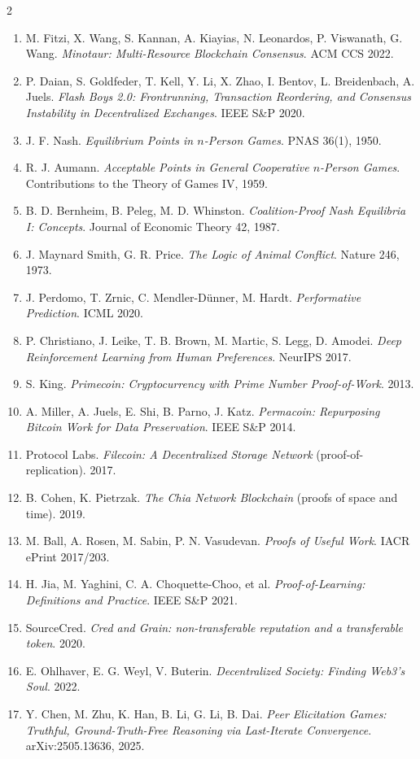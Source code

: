 \documentclass[10pt]{article}
\begin{document}
\begin{multicols}{2}
\begin{enumerate}[leftmargin=1.4em,itemsep=0pt]
\item M. Fitzi, X. Wang, S. Kannan, A. Kiayias, N. Leonardos, P. Viswanath, G. Wang. \emph{Minotaur: Multi-Resource Blockchain Consensus}. ACM CCS 2022.
\item P. Daian, S. Goldfeder, T. Kell, Y. Li, X. Zhao, I. Bentov, L. Breidenbach, A. Juels. \emph{Flash Boys 2.0: Frontrunning, Transaction Reordering, and Consensus Instability in Decentralized Exchanges}. IEEE S\&P 2020.
\item J. F. Nash. \emph{Equilibrium Points in $n$-Person Games}. PNAS 36(1), 1950.
\item R. J. Aumann. \emph{Acceptable Points in General Cooperative $n$-Person Games}. Contributions to the Theory of Games IV, 1959.
\item B. D. Bernheim, B. Peleg, M. D. Whinston. \emph{Coalition-Proof Nash Equilibria I: Concepts}. Journal of Economic Theory 42, 1987.
\item J. Maynard Smith, G. R. Price. \emph{The Logic of Animal Conflict}. Nature 246, 1973.
\item J. Perdomo, T. Zrnic, C. Mendler-D\"unner, M. Hardt. \emph{Performative Prediction}. ICML 2020.
\item P. Christiano, J. Leike, T. B. Brown, M. Martic, S. Legg, D. Amodei. \emph{Deep Reinforcement Learning from Human Preferences}. NeurIPS 2017.
\item S. King. \emph{Primecoin: Cryptocurrency with Prime Number Proof-of-Work}. 2013.
\item A. Miller, A. Juels, E. Shi, B. Parno, J. Katz. \emph{Permacoin: Repurposing Bitcoin Work for Data Preservation}. IEEE S\&P 2014.
\item Protocol Labs. \emph{Filecoin: A Decentralized Storage Network} (proof-of-replication). 2017.
\item B. Cohen, K. Pietrzak. \emph{The Chia Network Blockchain} (proofs of space and time). 2019.
\item M. Ball, A. Rosen, M. Sabin, P. N. Vasudevan. \emph{Proofs of Useful Work}. IACR ePrint 2017/203.
\item H. Jia, M. Yaghini, C. A. Choquette-Choo, et al. \emph{Proof-of-Learning: Definitions and Practice}. IEEE S\&P 2021.
\item SourceCred. \emph{Cred and Grain: non-transferable reputation and a transferable token}. 2020.
\item E. Ohlhaver, E. G. Weyl, V. Buterin. \emph{Decentralized Society: Finding Web3's Soul}. 2022.
\item Y. Chen, M. Zhu, K. Han, B. Li, G. Li, B. Dai. \emph{Peer Elicitation Games: Truthful, Ground-Truth-Free Reasoning via Last-Iterate Convergence}. arXiv:2505.13636, 2025.

\end{enumerate}
\end{multicols}
\end{document}
